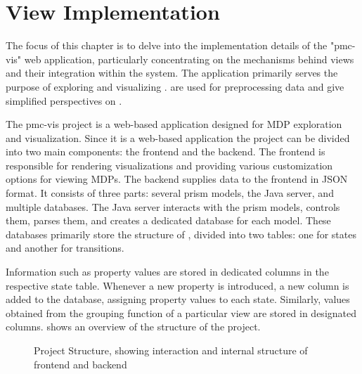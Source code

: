 \documentclass[preview]{standalone}
\begin{document}
\section{View Implementation} \label{ch:viewimpl}

The focus of this chapter is to delve into the implementation details of the "pmc-vis" web application, particularly concentrating on the mechanisms behind views and their integration within the system. The application primarily serves the purpose of exploring and visualizing \mdpsN. \viewsNC are used for preprocessing data and give simplified perspectives on \mdpsN.


The pmc-vis project is a web-based application designed for MDP exploration and visualization. Since it is a web-based application the project can be divided into two main components: the frontend and the backend. The frontend is responsible for rendering visualizations and providing various customization options for viewing MDPs. The backend supplies data to the frontend in JSON format. It consists of three parts: several prism models, the Java server, and multiple databases. The Java server interacts with the prism models, controls them, parses them, and creates a dedicated database for each model. These databases primarily store the structure of \mdpsN, divided into two tables: one for states and another for transitions.

Information such as property values are stored in dedicated columns in the respective state table. Whenever a new property is introduced, a new column is added to the database, assigning property values to each state. Similarly, values obtained from the grouping function of a particular view are stored in designated columns.  shows an overview of the structure of the project.

\begin{figure}[h]
	
	\caption{Project Structure, showing interaction and internal structure of frontend and backend}
	\label{fig:projectstructure}
\end{figure}
\end{document}
